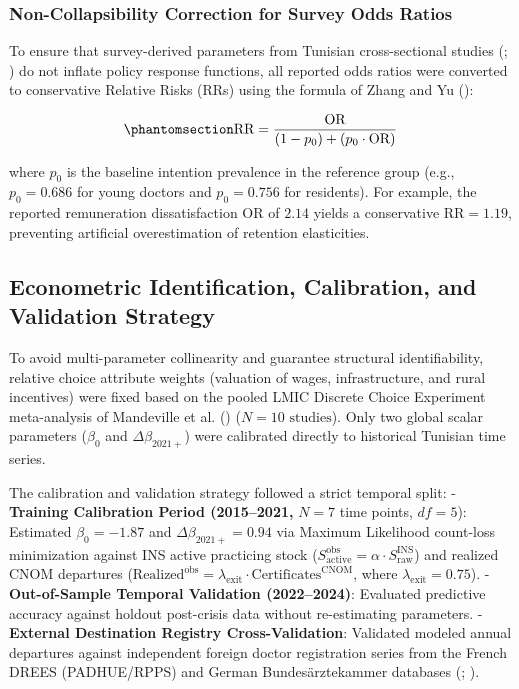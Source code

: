 \documentclass[
  11pt,
  a4paper]{article}
\begin{document}
\subsubsection{Non-Collapsibility Correction for Survey Odds
Ratios}\label{non-collapsibility-correction-for-survey-odds-ratios}

To ensure that survey-derived parameters from Tunisian cross-sectional
studies (;
) do not inflate policy
response functions, all reported odds ratios were converted to
conservative Relative Risks (RRs) using the formula of Zhang and Yu
():

\begin{equation}\protect\phantomsection\label{eq-zhang-yu}{\text{RR} = \frac{\text{OR}}{(1 - p_0) + (p_0 \cdot \text{OR})}}\end{equation}

where \(p_0\) is the baseline intention prevalence in the reference
group (e.g., \(p_0 = 0.686\) for young doctors and \(p_0 = 0.756\) for
residents). For example, the reported remuneration dissatisfaction OR of
\(2.14\) yields a conservative \(\text{RR} = 1.19\), preventing
artificial overestimation of retention elasticities.

\subsection{Econometric Identification, Calibration, and Validation
Strategy}\label{sec-methods-calibration}

To avoid multi-parameter collinearity and guarantee structural
identifiability, relative choice attribute weights (valuation of wages,
infrastructure, and rural incentives) were fixed based on the pooled
LMIC Discrete Choice Experiment meta-analysis of Mandeville et al.
() (\(N = 10 \text{ studies}\)). Only
two global scalar parameters (\(\beta_0\) and \(\Delta \beta_{2021+}\))
were calibrated directly to historical Tunisian time series.

The calibration and validation strategy followed a strict temporal
split: - \textbf{Training Calibration Period (2015--2021,} \(N = 7\)
time points, \(df = 5\)): Estimated \(\beta_0 = -1.87\) and
\(\Delta \beta_{2021+} = 0.94\) via Maximum Likelihood count-loss
minimization against INS active practicing stock
(\(S_{\text{active}}^{\text{obs}} = \alpha \cdot S_{\text{raw}}^{\text{INS}}\))
and realized CNOM departures
(\(\text{Realized}^{\text{obs}} = \lambda_{\text{exit}} \cdot \text{Certificates}^{\text{CNOM}}\),
where \(\lambda_{\text{exit}} = 0.75\)). - \textbf{Out-of-Sample
Temporal Validation (2022--2024)}: Evaluated predictive accuracy against
holdout post-crisis data without re-estimating parameters. -
\textbf{External Destination Registry Cross-Validation}: Validated
modeled annual departures against independent foreign doctor
registration series from the French DREES (PADHUE/RPPS) and German
Bundesärztekammer databases (; ).
\end{document}
